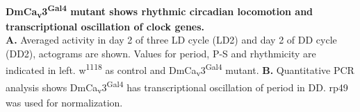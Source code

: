 \label{fig:4}
\textbf{DmCa\textsubscript{v}3\textsuperscript{Gal4} mutant shows rhythmic circadian locomotion and transcriptional oscillation of clock genes.}
\\
\textbf{A.} Averaged activity in day 2 of three LD cycle (LD2) and day 2 of DD cycle (DD2), actograms are shown.
Values for period, P-S and rhythmicity are indicated in left.
w\textsuperscript{1118} as control and DmCa\textsubscript{v}3\textsuperscript{Gal4} mutant.
\textbf{B.} Quantitative PCR analysis shows DmCa\textsubscript{v}3\textsuperscript{Gal4} has transcriptional oscillation of period in DD.
rp49 was used for normalization.
  